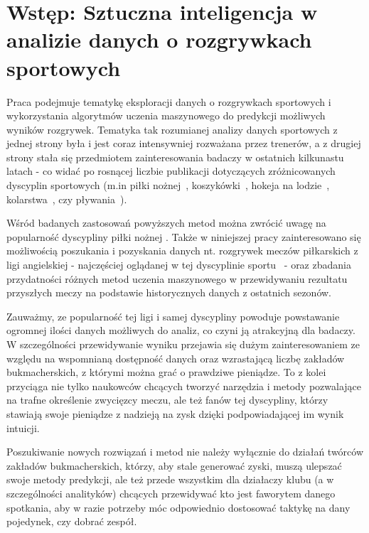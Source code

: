 
\chapter{Wstęp: Sztuczna inteligencja w analizie danych o rozgrywkach sportowych}

\noindent Praca podejmuje tematykę eksploracji danych o rozgrywkach sportowych i wykorzystania algorytmów uczenia maszynowego do predykcji możliwych wyników rozgrywek. Tematyka tak rozumianej analizy danych sportowych z jednej strony była i jest coraz intensywniej rozważana przez trenerów, a z drugiej strony stała się przedmiotem zainteresowania badaczy w ostatnich kilkunastu latach - co widać po rosnącej liczbie publikacji dotyczących zróżnicowanych dyscyplin sportowych (m.in piłki nożnej~\cite{Euro2016-1}, koszykówki~\cite{basketball}, hokeja na lodzie~\cite{ice-hockey}, kolarstwa~\cite{cyclists}, czy pływania~\cite{swimming}). 

Wśród badanych zastosowań powyższych metod można zwrócić uwagę na popularność dyscypliny piłki nożnej \cite{Euro2016-1} \cite{Euro2016-2} \cite{Euro2016-3} \cite{soccer_players_skill} \cite{ml_soccer_analytics}. Także w niniejszej pracy zainteresowano się możliwością poszukania i pozyskania danych nt. rozgrywek meczów piłkarskich z ligi angielskiej - najczęściej oglądanej w tej dyscyplinie sportu~\cite{ESPN} - oraz zbadania przydatności różnych metod uczenia maszynowego w przewidywaniu rezultatu przyszłych meczy na podstawie historycznych danych z ostatnich sezonów. 


Zauważmy, ze popularność tej ligi i samej dyscypliny powoduje powstawanie ogromnej ilości danych możliwych do analiz, co czyni ją atrakcyjną dla badaczy. W szczególności przewidywanie wyniku przejawia się dużym zainteresowaniem ze względu na wspomnianą dostępność danych oraz wzrastającą liczbę zakładów bukmacherskich, z którymi można grać o prawdziwe pieniądze. To z kolei przyciąga nie tylko naukowców chcących tworzyć narzędzia i metody pozwalające na trafne określenie zwycięzcy meczu, ale też fanów tej dyscypliny, którzy stawiają swoje pieniądze z nadzieją na zysk dzięki podpowiadającej im wynik intuicji. 

Poszukiwanie nowych rozwiązań i metod nie należy wyłącznie do działań  twórców zakładów bukmacherskich, którzy, aby stale generować zyski, muszą ulepszać swoje metody predykcji, ale też przede wszystkim dla działaczy klubu (a w szczególności analityków) chcących przewidywać kto jest faworytem danego spotkania, aby w razie potrzeby móc odpowiednio dostosować taktykę na dany pojedynek, czy dobrać zespół.

